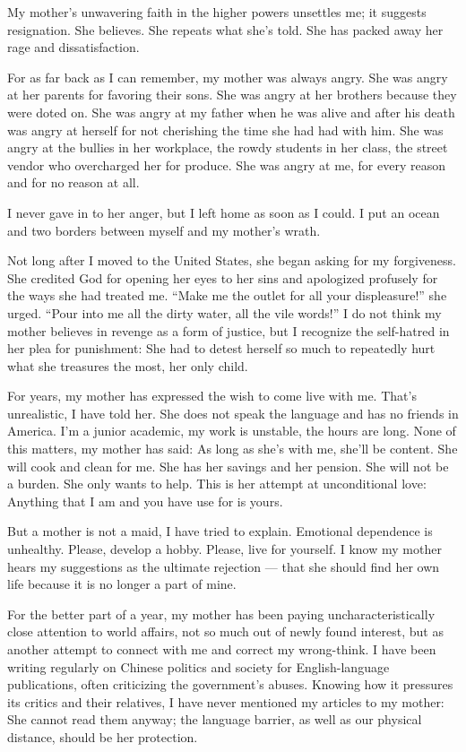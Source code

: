 My mother's unwavering faith in the higher powers unsettles me; it
suggests resignation. She believes. She repeats what she's told. She has
packed away her rage and dissatisfaction.

For as far back as I can remember, my mother was always angry. She was
angry at her parents for favoring their sons. She was angry at her
brothers because they were doted on. She was angry at my father when he
was alive and after his death was angry at herself for not cherishing
the time she had had with him. She was angry at the bullies in her
workplace, the rowdy students in her class, the street vendor who
overcharged her for produce. She was angry at me, for every reason and
for no reason at all.

I never gave in to her anger, but I left home as soon as I could. I put
an ocean and two borders between myself and my mother's wrath.

Not long after I moved to the United States, she began asking for my
forgiveness. She credited God for opening her eyes to her sins and
apologized profusely for the ways she had treated me. ``Make me the
outlet for all your displeasure!'' she urged. ``Pour into me all the
dirty water, all the vile words!'' I do not think my mother believes in
revenge as a form of justice, but I recognize the self-hatred in her
plea for punishment: She had to detest herself so much to repeatedly
hurt what she treasures the most, her only child.

For years, my mother has expressed the wish to come live with me. That's
unrealistic, I have told her. She does not speak the language and has no
friends in America. I'm a junior academic, my work is unstable, the
hours are long. None of this matters, my mother has said: As long as
she's with me, she'll be content. She will cook and clean for me. She
has her savings and her pension. She will not be a burden. She only
wants to help. This is her attempt at unconditional love: Anything that
I am and you have use for is yours.

But a mother is not a maid, I have tried to explain. Emotional
dependence is unhealthy. Please, develop a hobby. Please, live for
yourself. I know my mother hears my suggestions as the ultimate
rejection --- that she should find her own life because it is no longer
a part of mine.

For the better part of a year, my mother has been paying
uncharacteristically close attention to world affairs, not so much out
of newly found interest, but as another attempt to connect with me and
correct my wrong-think. I have been writing regularly on Chinese
politics and society for English-language publications, often
criticizing the government's abuses. Knowing how it pressures its
critics and their relatives, I have never mentioned my articles to my
mother: She cannot read them anyway; the language barrier, as well as
our physical distance, should be her protection.

